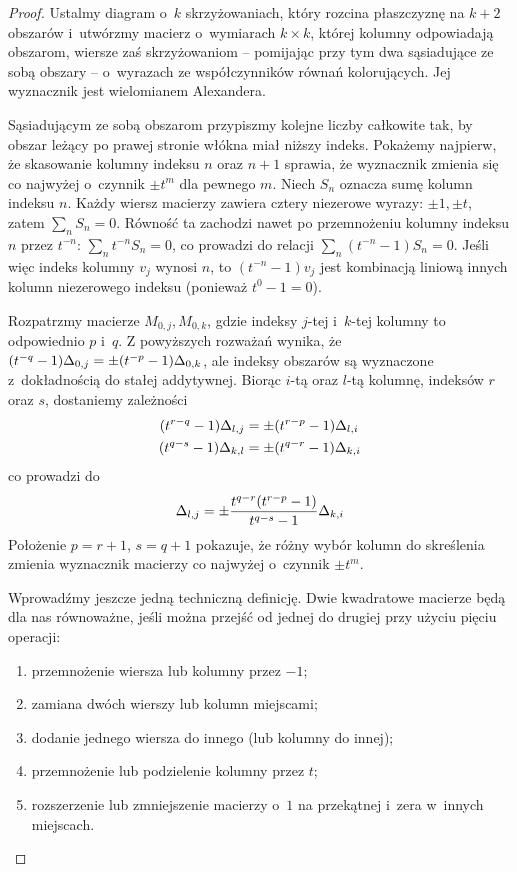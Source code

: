 \begin{proof}
    Ustalmy diagram o~$k$ skrzyżowaniach, który rozcina płaszczyznę na $k+2$ obszarów i~utwórzmy macierz o~wymiarach $k \times k$, której kolumny odpowiadają obszarom, wiersze zaś skrzyżowaniom -- pomijając przy tym dwa sąsiadujące ze sobą obszary -- o~wyrazach ze współczynników równań kolorujących.
    Jej wyznacznik jest wielomianem Alexandera.

    Sąsiadującym ze sobą obszarom przypiszmy kolejne liczby całkowite tak, by obszar leżący po prawej stronie włókna miał niższy indeks.
    Pokażemy najpierw, że skasowanie kolumny indeksu $n$ oraz $n+1$ sprawia, że wyznacznik zmienia się co najwyżej o~czynnik $\pm t^m$ dla pewnego $m$.
    Niech $S_n$ oznacza sumę kolumn indeksu $n$.
    Każdy wiersz macierzy zawiera cztery niezerowe wyrazy: $\pm 1, \pm t$, zatem $\sum_n S_n = 0$.
    Równość ta zachodzi nawet po przemnożeniu kolumny indeksu $n$ przez $t^{-n}$: $\sum_n t^{-n}S_n = 0$, co prowadzi do relacji $\sum_n (t^{-n}-1) S_n = 0$.
    Jeśli więc indeks kolumny $v_j$ wynosi $n$, to $(t^{-n}-1)v_j$ jest kombinacją liniową innych kolumn niezerowego indeksu (ponieważ $t^0 - 1 = 0$).

    Rozpatrzmy macierze $M_{0,j}, M_{0,k}$, gdzie indeksy $j$-tej i~$k$-tej kolumny to odpowiednio $p$ i~$q$.
    Z powyższych rozważań wynika, że $(t^{-q}-1) \Delta_{0,j} = \pm (t^{-p}-1)\Delta_{0,k}$, ale indeksy obszarów są wyznaczone z~dokładnością do stałej addytywnej.
    Biorąc $i$-tą oraz $l$-tą kolumnę, indeksów $r$ oraz $s$, dostaniemy zależności
    \begin{align}
        (t^{r-q}-1) \Delta_{l,j} & = \pm (t^{r-p} - 1)\Delta_{l,i} \\
        (t^{q-s}-1) \Delta_{k,l} & = \pm (t^{q-r} - 1)\Delta_{k,i}
    \end{align}
    co prowadzi do
    \begin{equation}
        \Delta_{l,j} = \pm \frac{t^{q-r}(t^{r-p}-1)}{t^{q-s}-1} \Delta_{k,i}
    \end{equation}
    Położenie $p = r +1$, $s =q+1$ pokazuje, że różny wybór kolumn do skreślenia zmienia wyznacznik macierzy co najwyżej o~czynnik $\pm t^m$.

    Wprowadźmy jeszcze jedną techniczną definicję.
    Dwie kwadratowe macierze będą dla nas równoważne, jeśli można przejść od jednej do drugiej przy użyciu pięciu operacji:
    \begin{enumerate}[leftmargin=*]
    \itemsep0em
        \item przemnożenie wiersza lub kolumny przez $-1$;
        \item zamiana dwóch wierszy lub kolumn miejscami;
        \item dodanie jednego wiersza do innego (lub kolumny do innej);
        \item przemnożenie lub podzielenie kolumny przez $t$;
        \item rozszerzenie lub zmniejszenie macierzy o~$1$ na przekątnej i~zera w~innych miejscach.
    \end{enumerate}


\end{proof}
